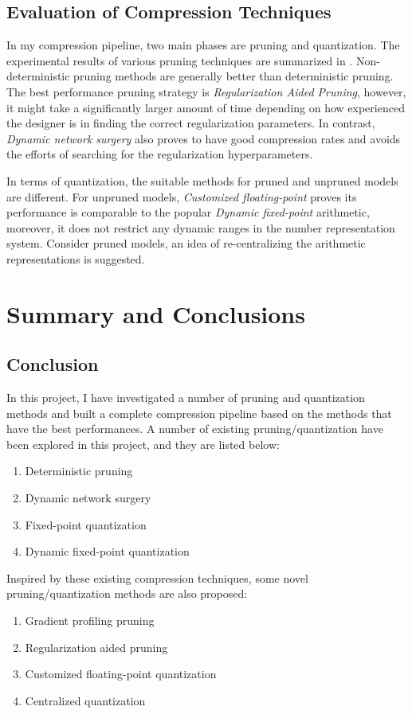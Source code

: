 \documentclass[a4paper,12pt]{report}
\begin{document}
\section{Evaluation of Compression Techniques}
In my compression pipeline, two main phases are pruning and quantization.
The experimental results of various pruning techniques are summarized in
.
Non-deterministic pruning methods are generally better than deterministic
pruning.
The best performance pruning strategy is \textit{Regularization Aided Pruning},
however, it might take a significantly larger amount of time depending on how
experienced the designer is in finding the correct regularization parameters.
In contrast, \textit{Dynamic network surgery} also proves to have good compression
rates and avoids the efforts of searching for the regularization hyperparameters.

In terms of quantization, the suitable methods for pruned and unpruned models
are different.
For unpruned models, \textit{Customized floating-point} proves its performance is
comparable to the popular \textit{Dynamic fixed-point} arithmetic, moreover,
it does not restrict any dynamic ranges in the number representation system.
Consider pruned models, an idea of re-centralizing the arithmetic representations
is suggested.




\chapter{Summary and Conclusions}
\section{Conclusion}
In this project, I have investigated a number of pruning and quantization methods
and built a complete compression pipeline based on the methods that have
the best performances.
A number of existing pruning/quantization have been explored in this project,
and they are listed below:
\begin{enumerate}
  \item Deterministic pruning
  \item Dynamic network surgery
  \item Fixed-point quantization
  \item Dynamic fixed-point quantization
\end{enumerate}
Inspired by these existing compression techniques,
some novel pruning/quantization methods are also proposed:
\begin{enumerate}
  \item Gradient profiling pruning
  \item Regularization aided pruning
  \item Customized floating-point quantization
  \item Centralized quantization
\end{enumerate}
\end{document}
